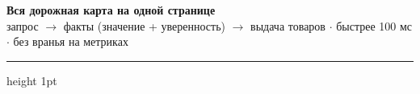\documentclass[11pt,a4paper]{article}
\begin{document}
\newpage
\begin{landscape}
\thispagestyle{empty}

\begin{center}
{\fontsize{17}{20}\selectfont\bfseries Вся дорожная карта на одной странице}\\[2pt]
{\small\color{inksoft}запрос $\to$ факты (значение + уверенность) $\to$ выдача товаров $\cdot$ быстрее 100 мс $\cdot$ без вранья на метриках}
\end{center}
{\color{mvred}\hrule height 1pt}
\vspace{6pt}

\begin{tcbraster}[raster columns=6, raster column skip=4pt, raster equal height,
  enhanced, colframe=rulec, boxrule=0.6pt, arc=1.5pt,
  left=4pt, right=4pt, top=3pt, bottom=3pt, colback=white]


\end{tcbraster}
\end{landscape}
\end{document}
